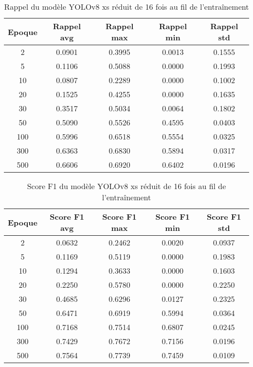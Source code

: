 \begin{table}[!ht]
    \caption{Rappel du modèle YOLOv8 xs réduit de 16 fois au fil de l'entraînement}
    \label{tab:yolov8xs_reduced16x_rappel}
    \centering
    \begin{tabular}{ |c||c|c|c|c|  }
        \hline
        \rowcolor{gray!50}
        Epoque & Rappel avg & Rappel max & Rappel min & Rappel std\\
        \hline
        2 & 0.0901 & 0.3995 & 0.0013 & 0.1555\\
        5 & 0.1106 & 0.5088 & 0.0000 & 0.1993\\
        10 & 0.0807 & 0.2289 & 0.0000 & 0.1002\\
        20 & 0.1525 & 0.4255 & 0.0000 & 0.1635\\
        30 & 0.3517 & 0.5034 & 0.0064 & 0.1802\\
        50 & 0.5090 & 0.5526 & 0.4595 & 0.0403\\
        100 & 0.5996 & 0.6518 & 0.5554 & 0.0325\\
        300 & 0.6363 & 0.6830 & 0.5894 & 0.0317\\
        500 & 0.6606 & 0.6920 & 0.6402 & 0.0196\\
        \hline
    \end{tabular}
\end{table}

\begin{table}[!ht]
    \caption{Score F1 du modèle YOLOv8 xs réduit de 16 fois au fil de l'entraînement}
    \label{tab:yolov8xs_reduced16x_f1score}
    \centering
    \begin{tabular}{ |c||c|c|c|c|  }
        \hline
        \rowcolor{gray!50}
        Epoque & Score F1 avg & Score F1 max & Score F1 min & Score F1 std\\
        \hline
        2 & 0.0632 & 0.2462 & 0.0020 & 0.0937\\
        5 & 0.1169 & 0.5119 & 0.0000 & 0.1983\\
        10 & 0.1294 & 0.3633 & 0.0000 & 0.1603\\
        20 & 0.2250 & 0.5780 & 0.0000 & 0.2250\\
        30 & 0.4685 & 0.6296 & 0.0127 & 0.2325\\
        50 & 0.6471 & 0.6919 & 0.5994 & 0.0364\\
        100 & 0.7168 & 0.7514 & 0.6807 & 0.0245\\
        300 & 0.7429 & 0.7672 & 0.7156 & 0.0196\\
        500 & 0.7564 & 0.7739 & 0.7459 & 0.0109\\
        \hline
    \end{tabular}
\end{table}

